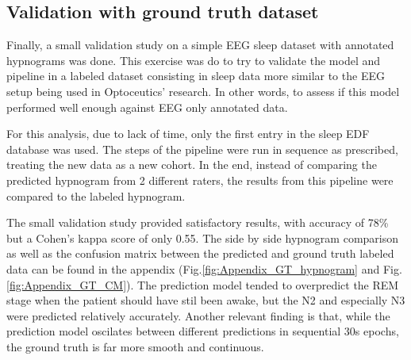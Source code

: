 \subsection{Validation with ground truth dataset}
Finally, a small validation study on a simple EEG sleep dataset with annotated hypnograms was done. This exercise was do to try to validate the model and pipeline in a labeled dataset consisting in sleep data more similar to the EEG setup being used in Optoceutics' research. In other words, to assess if this model performed well enough against EEG only annotated data.

For this analysis, due to lack of time, only the first entry in the sleep EDF database \cite{kemp2018sleepEDFwebsite,2000sleepEDForiginal} was used. The steps of the pipeline were run in sequence as prescribed, treating the new data as a new cohort. In the end, instead of comparing the predicted hypnogram from 2 different raters, the results from this pipeline were compared to the labeled hypnogram. 

The small validation study provided satisfactory results, with accuracy of 78\% but a Cohen's kappa score of only 0.55. The side by side hypnogram comparison as well as the confusion matrix between the predicted and ground truth labeled data can be found in the appendix (Fig.\ref{fig:Appendix_GT_hypnogram} and Fig.\ref{fig:Appendix_GT_CM}). The prediction model tended to overpredict the REM stage when the patient should have stil been awake, but the N2 and especially N3 were predicted relatively accurately. Another relevant finding is that, while the prediction model oscilates between different predictions in sequential 30s epochs, the ground truth is far more smooth and continuous.

